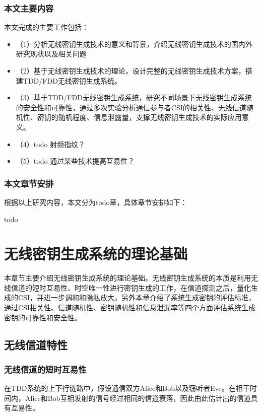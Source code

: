 \documentclass[master]{seuthesis} %
\begin{document}
\begin{Main}
\subsection{本文主要内容}

本文完成的主要工作包括：

\begin{itemize}
    \item（1）分析无线密钥生成技术的意义和背景，介绍无线密钥生成技术的国内外研究现状以及相关问题
    \item（2）基于无线密钥生成技术的理论，设计完整的无线密钥生成技术方案，搭建TDD/FDD无线密钥生成系统。
    \item（3）基于TDD/FDD无线密钥生成系统，研究不同场景下无线密钥生成系统的安全性和可靠性，通过多次实验分析通信参与者CSI的相关性、无线信道随机性、密钥的随机程度、信息泄露量，支撑无线密钥生成技术的实际应用意义。
    \item（4）todo 射频指纹？
    \item（5）todo 通过某些技术提高互易性？
\end{itemize}

\subsection{本文章节安排}

根据以上研究内容，本文分为todo章，具体章节安排如下：

todo

\chapter{无线密钥生成系统的理论基础}

本章节主要介绍无线密钥生成系统的理论基础。无线密钥生成系统的本质是利用无线信道的短时互易性、时空唯一性进行密钥生成的工作，在信道探测之后，量化生成的CSI，并进一步调和和隐私放大。另外本章介绍了系统生成密钥的评估标准，通过CSI相关性、信道随机性、密钥随机性和信息泄漏率等四个方面评估系统生成密钥的可靠性和安全性。

\section{无线信道特性}

\subsection{无线信道的短时互易性}

在TDD系统的上下行链路中，假设通信双方Alice和Bob以及窃听者Eve。在相干时间内，Alice和Bob互相发射的信号经过相同的信道衰落，因此由此估计出的信道具有互易性。


\end{Main}
\end{document}
